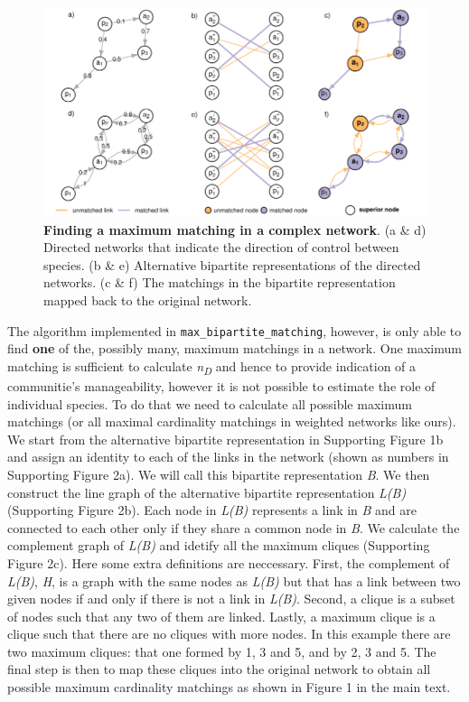 \documentclass[a4paper]{artikel1}
\begin{document}
\begin{figure}[htbp]
\centering
\includegraphics{supp_info_2_files/figure-latex/fig-direction-of-control-1.pdf}
\caption{\textbf{Finding a maximum matching in a complex network}. (a \&
d) Directed networks that indicate the direction of control between
species. (b \& e) Alternative bipartite representations of the directed
networks. (c \& f) The matchings in the bipartite representation mapped
back to the original network.}
\end{figure}

The algorithm implemented in \texttt{max\_bipartite\_matching}, however,
is only able to find \textbf{one} of the, possibly many, maximum
matchings in a network. One maximum matching is sufficient to calculate
\emph{n\textsubscript{D}} and hence to provide indication of a
communitie's manageability, however it is not possible to estimate the
role of individual species. To do that we need to calculate all possible
maximum matchings (or all maximal cardinality matchings in weighted
networks like ours). We start from the alternative bipartite
representation in Supporting Figure 1b and assign an identity to each of
the links in the network (shown as numbers in Supporting Figure 2a). We
will call this bipartite representation \emph{B}. We then construct the
line graph of the alternative bipartite representation \emph{L(B)}
(Supporting Figure 2b). Each node in \emph{L(B)} represents a link in
\emph{B} and are connected to each other only if they share a common
node in \emph{B}. We calculate the complement graph of \emph{L(B)} and
idetify all the maximum cliques (Supporting Figure 2c). Here some extra
definitions are neccessary. First, the complement of \emph{L(B)},
\emph{H}, is a graph with the same nodes as \emph{L(B)} but that has a
link between two given nodes if and only if there is not a link in
\emph{L(B)}. Second, a clique is a subset of nodes such that any two of
them are linked. Lastly, a maximum clique is a clique such that there
are no cliques with more nodes. In this example there are two maximum
cliques: that one formed by 1, 3 and 5, and by 2, 3 and 5. The final
step is then to map these cliques into the original network to obtain
all possible maximum cardinality matchings as shown in Figure 1 in the
main text.
\end{document}
